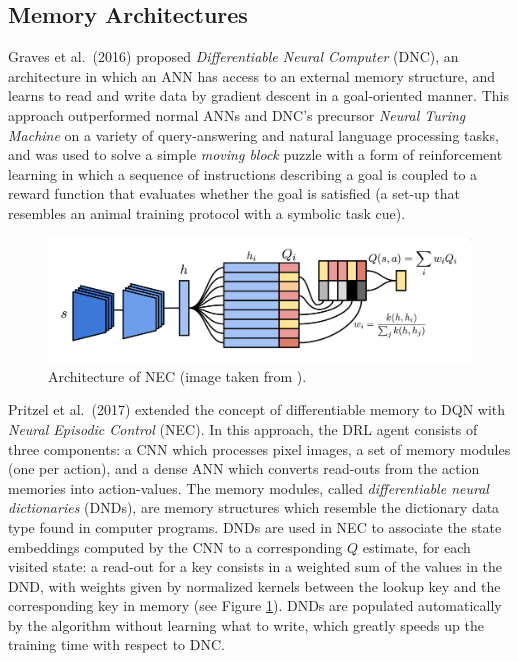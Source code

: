\subsection{Memory Architectures} \label{s:memory}
Graves et al.\ (2016) \cite{graves2016hybrid} proposed \textit{Differentiable 
Neural Computer} (DNC), an architecture in which an ANN has access to an 
external memory structure, and learns to read and write data by gradient descent
in a goal-oriented manner.
This approach outperformed normal ANNs and DNC's precursor \textit{Neural 
Turing Machine} \cite{gravesneural} on a variety of query-answering and natural 
language processing tasks, and was used to solve a simple \textit{moving block} 
puzzle with a form of reinforcement learning in which a sequence of instructions
describing a goal is coupled to a reward function that evaluates whether the 
goal is satisfied (a set-up that resembles an animal training protocol with a 
symbolic task cue).
%
\begin{figure}
    \includegraphics[width=\textwidth]{pictures/nec}
    \centering
    \caption[Architecture of NEC]{Architecture of NEC (image taken from 
				\cite{pritzel2017neural}).}
\label{f:nec}
\end{figure}
%

Pritzel et al.\ (2017) \cite{pritzel2017neural} extended the concept of 
differentiable memory to DQN with \textit{Neural Episodic Control} (NEC). 
In this approach, the DRL agent consists of three components: a CNN which 
processes pixel images, a set of memory modules (one per action), and a dense 
ANN which converts read-outs from the action memories into action-values. The 
memory modules, called \textit{differentiable neural dictionaries} (DNDs), are 
memory structures which resemble the dictionary data type found in computer 
programs. DNDs are used in NEC to associate the state embeddings computed by the
CNN to a corresponding $Q$ estimate, for each visited state: a read-out for a 
key consists in a weighted sum of the values in the DND, with weights given by 
normalized kernels between the lookup key and the corresponding key in memory 
(see Figure \ref{f:nec}). 
DNDs are populated automatically by the algorithm without learning what to write,
which greatly speeds up the training time with respect to DNC.

